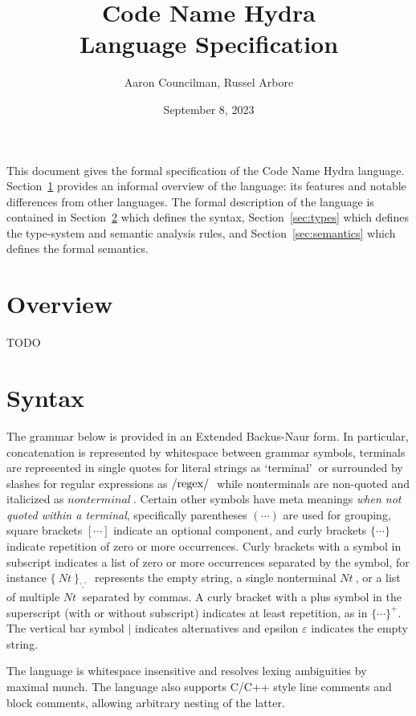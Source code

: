 \documentclass[letterpaper]{article}
\title{Code Name Hydra \\ \large Language Specification}
\author{Aaron Councilman, Russel Arbore}
\date{September 8, 2023}
\newcommand{\nonterminal}[1]{#1\ }
\newcommand{\terminal}[1]{\text{`#1'}\ }
\newcommand{\regex}[1]{\text{\lstinline$/#1/$}\ }
\newcommand*{\gramRepeat}[2][]{\{\ #2\}_{#1}\ }
\begin{document}
\maketitle

This document gives the formal specification of the Code Name Hydra language.
Section~\ref{sec:overview} provides an informal overview of the language: its features and notable differences from other languages.
The formal description of the language is contained in Section~\ref{sec:syntax} which defines the syntax, Section~\ref{sec:types} which defines the type-system and semantic analysis rules, and Section~\ref{sec:semantics} which defines the formal semantics.

\section{Overview}\label{sec:overview}
TODO

\section{Syntax}\label{sec:syntax}
The grammar below is provided in an Extended Backus-Naur form.
In particular, concatenation is represented by whitespace between grammar symbols, terminals are represented in single quotes for literal strings as $\terminal{terminal}$ or surrounded by slashes for regular expressions as $\regex{regex}$ while nonterminals are non-quoted and italicized as $\nonterminal{nonterminal}$.
Certain other symbols have meta meanings \emph{when not quoted within a terminal}, specifically parentheses $(\cdots)$ are used for grouping, square brackets $[\cdots]$ indicate an optional component, and curly brackets $\{ \cdots \}$ indicate repetition of zero or more occurrences.
Curly brackets with a symbol in subscript indicates a list of zero or more occurrences separated by the symbol, for instance $\gramRepeat[\terminal{,}]{\nonterminal{Nt}}$ represents the empty string, a single nonterminal $\nonterminal{Nt}$, or a list of multiple $\nonterminal{Nt}$ separated by commas.
A curly bracket with a plus symbol in the superscript (with or without subscript) indicates at least repetition, as in $\{ \cdots \}^{+}$.
The vertical bar symbol $\mid$ indicates alternatives and epsilon $\varepsilon$ indicates the empty string.

The language is whitespace insensitive and resolves lexing ambiguities by maximal munch.
The language also supports C/C++ style line comments and block comments, allowing arbitrary nesting of the latter.
\end{document}
